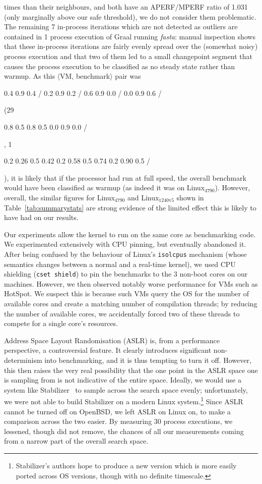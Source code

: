 \documentclass[acmsmall,screen]{acmart}
\newcommand{\fasta}{\emph{fasta}\xspace}
\newcommand{\bencherfive}{Linux$_\mathrm{4790}$\xspace}
\newcommand{\bencherseven}{Linux$_\mathrm{1240v5}$\xspace}
\newcommand{\vmbpair}{$\langle$VM, benchmark$\rangle$\xspace}
\newcommand{\numpexecs}{30\xspace}
\DeclareRobustCommand{\nosteadystate}{%
\setlength{\sparklinethickness}{0.4pt}%
\begin{sparkline}{1.5}
\spark 0.1 0.2
       0.26 0.5
       0.42 0.2
       0.58 0.5
       0.74 0.2
       0.90 0.5
       /%
\end{sparkline}\xspace%
}
\DeclareRobustCommand{\warmup}{%
\setlength{\sparklinethickness}{0.4pt}%
\begin{sparkline}{1.5}
\spark 0.1 0.8
       0.5 0.8
       0.5 0.0
       0.9 0.0
       /%
\end{sparkline}\xspace%
}
\DeclareRobustCommand{\badinconsistent}{%
\setlength{\sparklinethickness}{0.4pt}%
\begin{sparkline}{1.5}
\spark 0.1 0.4
       0.9 0.4
       /%
\spark 0.1 0.2
       0.9 0.2
       /%
\spark 0.1 0.6
       0.9 0.0
       /%
\spark 0.1 0.0
       0.9 0.6
       /%
\end{sparkline}\xspace%
}
\begin{document}
times than their neighbours, and both have an APERF/MPERF ratio of 1.031
(only marginally above our safe threshold), we do not consider them problematic.
The remaining 7 in-process iterations which are not
detected as outliers are contained in 1 process execution of Graal running
\fasta: manual inspection shows that these in-process iterations are fairly
evenly spread over the (somewhat noisy) process execution and that two of them led
to a small changepoint segment that causes the process execution to be
classified as no steady state rather than warmup. As this \vmbpair pair was
\badinconsistent(29\warmup, 1\nosteadystate), it is likely that if
the processor had run at full speed, the overall benchmark
would have been classified as warmup (as indeed it was
on \bencherfive). However, overall, the similar figures
for \bencherfive and \bencherseven shown in Table~\ref{tab:summarystats} are
strong evidence of the limited effect this is likely to have had on our results.

Our experiments allow the kernel to run on the same core as benchmarking code.
We experimented extensively with CPU pinning, but eventually abandoned it. After
being confused by the behaviour of Linux's \texttt{isolcpus} mechanism (whose
semantics changes between a normal and a real-time kernel), we used CPU shielding
(\texttt{cset shield}) to pin the benchmarks to the 3 non-boot cores on our
machines. However, we then observed notably worse performance for VMs such as
HotSpot. We suspect this is because such VMs query the OS for the number of
available cores and create a matching number of compilation threads; by reducing
the number of available cores, we accidentally forced two of these threads to
compete for a single core's resources.

Address Space Layout Randomisation (ASLR) is, from a performance perspective, a
controversial feature. It clearly introduces significant non-determinism into
benchmarking, and it is thus tempting to turn it off. However, this then raises
the very real possibility that the one point in the ASLR space one is sampling
from is not indicative of the entire space. Ideally, we would use a system like
Stabilizer~\cite{curtsinger13stabilizer} to
sample across the search space evenly; unfortunately, we were not able to build
Stabilizer on a modern Linux system.\footnote{Stabilizer's authors hope to
produce a new version which is more easily ported across OS versions, though
with no definite timescale.} Since ASLR cannot be turned off on OpenBSD,
we left ASLR on Linux on, to make a comparison across the two easier.
By measuring \numpexecs process executions, we lessened, though did not
remove, the chances of all our measurements coming from a narrow part of the
overall search space.
\end{document}
